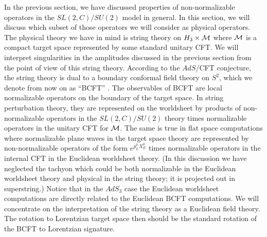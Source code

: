 In the previous section, we have discussed properties of non-normalizable
operators in the $SL(2,C)/SU(2)$ model in general. In this section, we
will discuss which subset of those operators we will consider as
physical operators.
The physical theory we have in mind is string theory on
$H_3 \times {\cal M}$ where ${\cal M}$ is a compact target space
represented by some standard
unitary CFT. We will interpret
singularities in the amplitudes discussed in the previous section
from the point of view of this string theory. According to the
$AdS$/CFT conjecture, the string theory is dual to a boundary conformal field
theory on $S^2$, which we denote from now on as ``BCFT'' \magoo .
The observables of BCFT are local normalizable
operators on the boundary of the target space.
In  string perturbation theory, they are represented on
the worldsheet by products of non-normalizable operators
in the $SL(2,C)/SU(2)$ theory times normalizable operators
in the unitary CFT for ${\cal M}$.
The same is true in flat space computations where  normalizable plane
waves in the target space theory are represented by
non-normalizable operators of the form $e^{p_L^0 X^0_E}$
times normalizable
operators in the internal CFT
in the Euclidean worldsheet theory.
(In this discussion we have neglected the tachyon which could be
both normalizable in the Euclidean worldsheet theory
and physical in the string theory; it is projected out
in superstring.)
Notice that in the $AdS_3$ case the Euclidean worldsheet computations
are directly related to the Euclidean BCFT computations. We will
concentrate on the interpretation of the string theory as a Euclidean
field theory. The rotation to Lorentzian target space then should
be the standard rotation of the BCFT to Lorentzian signature.



